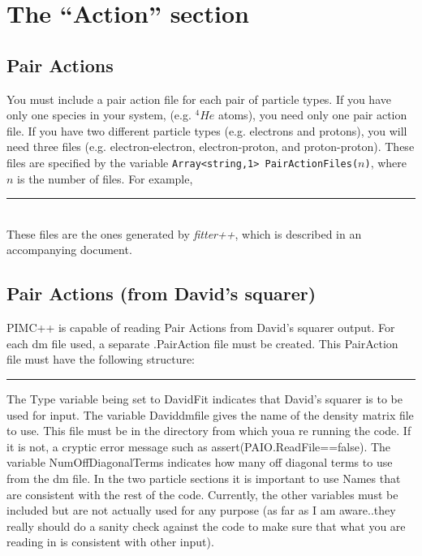 \documentclass{book}
\begin{document}
\section{The ``Action'' section}
\subsection{Pair Actions}
You must include a pair action file for each pair of particle types.
If you have only one species in your system, (e.g. $^4He$ atoms), you
need only one pair action file.  If you have two different particle types
(e.g. electrons and protons), you will need three files
(e.g. electron-electron, electron-proton, and proton-proton).  These
files are specified by the variable \texttt{Array<string,1>
  PairActionFiles($n$)}, where $n$ is the number of files.  For
example, \\ 
\rule{0.6cm}{0cm}\\
These files are the ones generated by {\em fitter++}, which is
described in an accompanying document.

\subsection{Pair Actions (from David's squarer)}
PIMC++ is capable of reading Pair Actions from David's squarer output.
For each dm file used, a separate .PairAction file must be created.
This PairAction file must have the following structure:
\rule{0.0cm}{0.75cm}\rule{0.6cm}{0cm}
The Type variable being set to DavidFit indicates that David's squarer
is to be used for input.  The variable Daviddmfile gives the name of
the density matrix file to use.  This file must be in the directory
from which youa re running the code. If it is not, a cryptic error
message such as assert(PAIO.ReadFile==false).  The variable
NumOffDiagonalTerms indicates how many off diagonal terms to use from
the dm file.  In the two particle sections it is important to use
Names that are consistent with the rest of the code. Currently, the
other variables must be included but are not actually used for any
purpose (as far as I am aware..they really should do a sanity check
against the code to make sure that what you are reading in is
consistent with other input).
\end{document}
